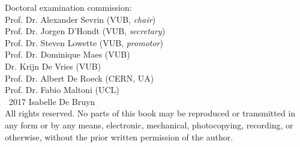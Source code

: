 \documentclass[11pt,b5paper,twoside,dutch,english]{book}
\begin{document}
\clearpage
\thispagestyle{empty}
\large
 \noindent
Doctoral examination commission:\\

 \noindent
Prof. Dr. Alexander Sevrin (VUB, \textit{chair})\\
Prof. Dr. Jorgen D'Hondt (VUB, \textit{secretary})\\
Prof. Dr. Steven Lowette (VUB, \textit{promotor})\\
Prof. Dr. Dominique Maes (VUB)\\
Dr. Krijn De Vries (VUB)\\
Prof. Dr. Albert De Roeck (CERN, UA)\\
Prof. Dr. Fabio Maltoni (UCL)\\

% 
% 
% 
\vfill
 \noindent
\textcopyright\ 2017 Isabelle De Bruyn\\

 \noindent
All rights reserved. No parts of this book may be reproduced or transmitted in any form or by any means, electronic, mechanical, photocopying, recording, or otherwise, without the prior written permission of the author.
\normalsize
% 

\clearpage{\pagestyle{empty}\cleardoublepage}




\frontmatter



\end{document}
